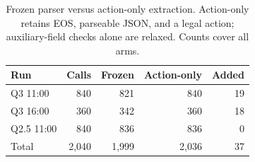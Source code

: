 \begin{table}[t]
\caption{Frozen parser versus action-only extraction. Action-only retains EOS, parseable JSON, and a legal action; auxiliary-field checks alone are relaxed. Counts cover all arms.}
\label{tab:measurement}
\centering\small\setlength{\tabcolsep}{3pt}
\begin{tabular}{lrrrr}\toprule
Run & Calls & Frozen & Action-only & Added\\\midrule
Q3 11:00 & 840 & 821 & 840 & 19\\
Q3 16:00 & 360 & 342 & 360 & 18\\
Q2.5 11:00 & 840 & 836 & 836 & 0\\
\midrule
Total & 2,040 & 1,999 & 2,036 & 37\\
\bottomrule\end{tabular}
\end{table}
